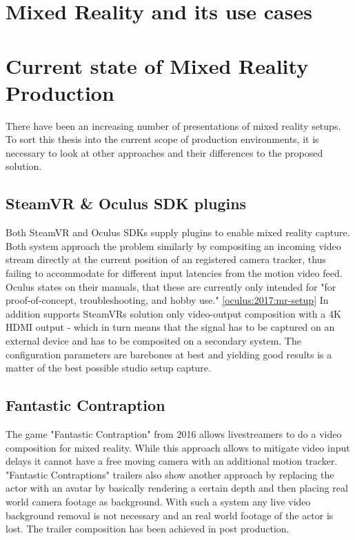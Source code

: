 \section{Mixed Reality and its use cases}


\section{Current state of Mixed Reality Production}

There have been an increasing number of presentations of mixed reality setups. 
To sort this thesis into the current scope of production environments, it is 
necessary to look at other approaches and their differences to the proposed 
solution.

\subsection{SteamVR \& Oculus SDK plugins}

Both SteamVR and Oculus SDKs supply plugins to enable mixed reality capture. 
Both system approach the problem similarly by compositing an incoming video 
stream directly at the current position of an registered camera tracker, thus 
failing to accommodate for different input latencies from the motion video 
feed. Oculus states on their manuals, that these are currently only intended 
for "for proof-of-concept, troubleshooting, and hobby use." 
\ref{oculus:2017:mr-setup}
\newline
In addition supports SteamVRs solution only video-output composition with a 4K 
HDMI output - which in turn means that the signal has to be captured on an 
external device and has to be composited on a secondary system. The 
configuration parameters are barebones at best and yielding good results is a 
matter of the best possible studio setup capture.

\subsection{Fantastic Contraption}

The game "Fantastic Contraption" from 2016 allows livestreamers to do a video 
composition for mixed reality. While this approach allows to mitigate video 
input delays it cannot have a free moving camera with an additional motion 
tracker.
\newline
"Fantastic Contraptions" trailers also show another approach by replacing the 
actor with an avatar by basically rendering a certain depth and then placing 
real world camera footage as background. With such a system any live video 
background removal is not necessary and an real world footage of the actor is 
lost. The trailer composition has been achieved in post production.

